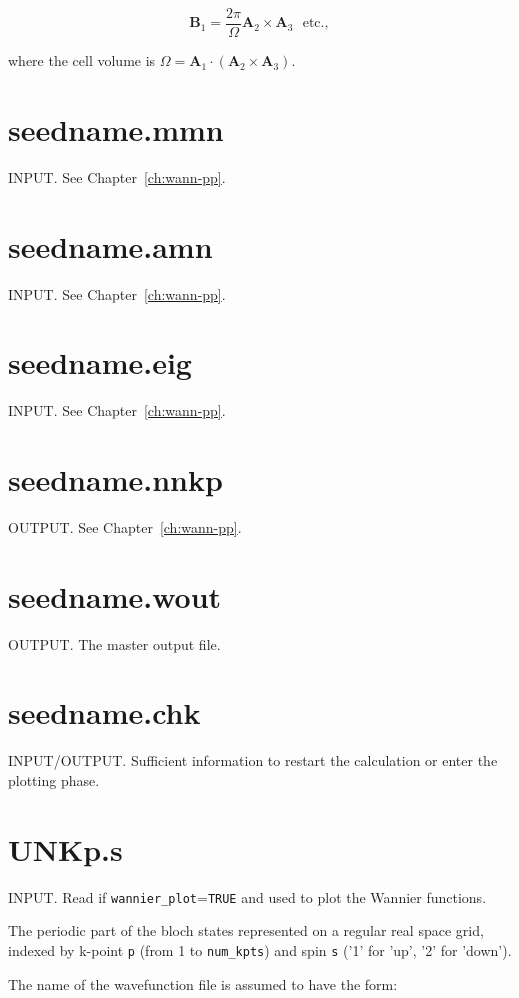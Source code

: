 \begin{equation}
\mathbf{B}_{1} = \frac{2\pi}{\Omega}\mathbf{A}_{2}\times\mathbf{A}_{3}
\ \ \ \mathrm{etc.},
\end{equation}

where the cell volume is
$\Omega=\mathbf{A}_{1}\cdot(\mathbf{A}_{2}\times\mathbf{A}_{3})$.

\section{seedname.mmn}
INPUT. See Chapter~\ref{ch:wann-pp}.

\section{seedname.amn}
INPUT. See Chapter~\ref{ch:wann-pp}.

\section{seedname.eig}
INPUT. See Chapter~\ref{ch:wann-pp}.

\section{seedname.nnkp} \label{sec:old-nnkp}
OUTPUT. See Chapter~\ref{ch:wann-pp}.

\section{seedname.wout}
OUTPUT. The master output file.


\section{seedname.chk}
INPUT/OUTPUT. Sufficient information to restart the calculation or enter the
plotting phase.

\section{UNKp.s}
INPUT. Read if \verb#wannier_plot#=\verb#TRUE# and used to plot the
Wannier functions.

The periodic part of the bloch states represented on a regular real
 space grid, indexed by k-point \verb#p# (from 1 to \verb#num_kpts#)
 and spin \verb#s# ('1' for 'up', '2' for 'down').

The name of the wavefunction file is assumed to have the form:

